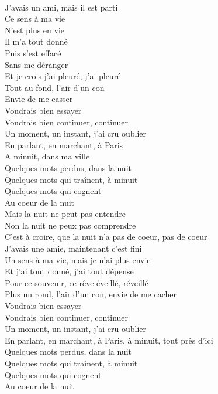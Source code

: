  \\
J'avais un ami, mais il est parti \\
Ce sens à ma vie \\
N'est plus en vie \\
Il m'a tout donné \\
Puis s'est effacé \\
Sans me déranger \\
Et je crois j'ai pleuré, j'ai pleuré \\
Tout au fond, l'air d'un con \\
Envie de me casser \\
Voudrais bien essayer \\
Voudrais bien continuer, continuer \\
Un moment, un instant, j'ai cru oublier \\
En parlant, en marchant, à Paris \\
A minuit, dans ma ville \\
Quelques mots perdus, dans la nuit \\
Quelques mots qui traînent, à minuit \\
Quelques mots qui cognent \\
Au coeur de la nuit \\
Mais la nuit ne peut pas entendre \\
Non la nuit ne peux pas comprendre \\
C'est à croire, que la nuit n'a pas de coeur, pas de coeur \\
J'avais une amie, maintenant c'est fini \\
Un sens à ma vie, mais je n'ai plus envie \\
Et j'ai tout donné, j'ai tout dépense \\
Pour ce souvenir, ce rêve éveillé, réveillé \\
Plus un rond, l'air d'un con, envie de me cacher \\
Voudrais bien essayer \\
Voudrais bien continuer, continuer \\
Un moment, un instant, j'ai cru oublier \\
En parlant, en marchant, à Paris, à minuit, tout près d'ici \\
Quelques mots perdus, dans la nuit \\
Quelques mots qui traînent, à minuit \\
Quelques mots qui cognent \\
Au coeur de la nuit \\
